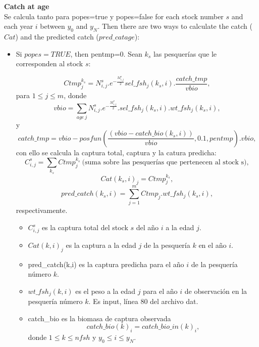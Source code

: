 \documentclass{article}
\begin{document}
\textbf{Catch at age}\\
Se calcula tanto para popes=true y popes=false for each stock number $s$ and  each year $i$ between $y_0$ and $y_N$. Then there are two ways to calculate the catch ($Cat$) and the predicted catch ($pred\_catage$):
\begin{itemize}
    \item Si $popes=TRUE$, then pentmp=0. Sean  $k_s$ las pesquerías que le corresponden al stock $s$:
        
    \begin{equation}
        Ctmp^{k_s}_j=N^s_{i,j}.e^{-\frac{M^s_{i,j}}{2}}sel\_fsh_j(k_s,i).\dfrac{catch\_tmp}{vbio},
    \end{equation}
    para $1\leq j \leq m$, donde 
    \begin{equation}
        vbio=\sum_{age\ j}N^s_{i,j}.e^{-\frac{M^s_{i,j}}{2}}.sel\_fsh_j(k_s,i).wt\_fsh_j(k_s,i),
    \end{equation}
    y 
        \begin{equation}
        catch\_tmp=vbio-posfun\left(\frac{(vbio - catch\_bio(k_s,i))}{vbio} , 0.1 , pentmp \right).vbio,
    \end{equation}
    con ello se calcula la captura total, captura y la catura predicha:
    \begin{equation}
        C^s_{i,j}=\sum_{k_s}Ctmp^{k_s}_j \ \text{(suma sobre las pesquerías que pertenecen al stock s)},
    \end{equation}
    \begin{equation}
        Cat(k_s,i)_j=Ctmp^{k_s}_j,
    \end{equation}
    \begin{equation}
            pred\_catch(k_s,i)=\sum_{j=1}^{m}Ctmp_j.wt\_fsh_j(k_s,i),
        \end{equation} respectivamente.
\begin{itemize}
    \item $C^s_{i,j}$ es la captura total del stock $s$ del año $i$ a la edad $j$.
    \item $Cat(k,i)_j$ es la  captura a la edad $j$ de la pesquería $k$ en el año $i$.
    \item pred\_catch(k,i) es la captura predicha para el año $i$ de la pesquería número $k$.
    \item $wt\_fsh_j(k,i)$ es el peso a la edad $j$ para el año $i$ de observación en la pesquería número $k$. Es input, línea 80 del archivo dat.
        \item catch\_bio es la biomasa de captura observada
        \begin{equation}
          catch\_bio(k)_i=catch\_bio\_in(k)_i,  
        \end{equation}
        donde $1\leq k \leq nfsh$ y $y_0\leq i \leq y_N$.


\end{itemize}
\end{itemize}
\end{document}
